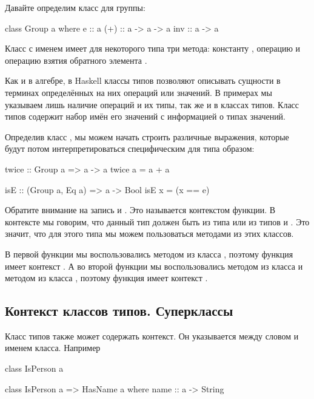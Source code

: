 Давайте определим класс для группы:

\begin{code}
class Group a where
    e   :: a
    (+) :: a -> a -> a
    inv :: a -> a
\end{code}

Класс с именем  имеет для некоторого типа  
три метода: константу , операцию 
и операцию взятия обратного элемента .

Как и в алгебре, в Haskell классы типов позволяют описывать 
сущности в терминах определённых на них операций или значений.
В примерах мы указываем лишь наличие операций и их типы, так же
и в классах типов. Класс типов содержит набор имён его значений 
с информацией о типах значений.

Определив класс , мы можем начать строить 
различные выражения, которые будут потом интерпретироваться
специфическим для типа образом:

\begin{code}
twice :: Group a => a -> a
twice a = a + a

isE :: (Group a, Eq a) => a -> Bool
isE x = (x == e)
\end{code}

Обратите внимание на запись  и 
. Это называется контекстом функции. 
В контексте мы говорим, что данный тип должен быть из 
типа  или из типов  и . Это
значит, что для этого типа мы можем пользоваться методами
из этих классов.

В первой функции  мы воспользовались методом
\In{(+)} из класса , поэтому функция имеет
контекст . А во второй функции  
мы воспользовались методом  из класса  и
методом \In{(==)} из класса , поэтому функция
имеет контекст .

\subsection{Контекст классов типов. Суперклассы}

Класс типов также может содержать контекст. Он указывается
между словом  и именем класса. Например


\begin{code}
class IsPerson a

class IsPerson a => HasName a where
    name :: a -> String
\end{code}

